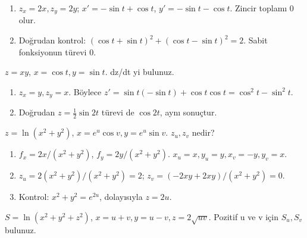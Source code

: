 \begin{tcolorbox}[title={Adım adım çözüm},colback=green!3!white,colframe=green]\begin{enumerate}
\item \(z_x=2x,z_y=2y\); \(x\prime=-\sin t+\cos t\), \(y\prime=-\sin t-\cos t\). Zincir toplamı 0 olur.
\item Doğrudan kontrol: \((\cos t+\sin t)^2+(\cos t-\sin t)^2=2\). Sabit fonksiyonun türevi 0.
\end{enumerate}\end{tcolorbox}
\begin{tcolorbox}[title={Örnek 6.2 | Çarpanlı fonksiyonda zincir kuralı},colframe=accent]\(z=xy\), \(x=\cos t,y=\sin t\). dz/dt yi bulunuz.
\par{}\end{tcolorbox}
\begin{tcolorbox}[title={Adım adım çözüm},colback=green!3!white,colframe=green]\begin{enumerate}
\item \(z_x=y,z_y=x\). Böylece \(z\prime=\sin t(-\sin t)+\cos t\cos t=\cos^2t-\sin^2t\).
\item Doğrudan \(z=\tfrac12\sin2t\) türevi de \(\cos2t\), aynı sonuçtur.
\end{enumerate}\end{tcolorbox}
\begin{tcolorbox}[title={Örnek 6.3 | Tahtadaki logaritma örneği},colframe=accent]\(z=\ln(x^2+y^2)\), \(x=e^u\cos v,y=e^u\sin v\). \(z_u,z_v\) nedir?
\par{}\end{tcolorbox}
\begin{tcolorbox}[title={Adım adım çözüm},colback=green!3!white,colframe=green]\begin{enumerate}
\item \(f_x=2x/(x^2+y^2)\), \(f_y=2y/(x^2+y^2)\). \(x_u=x,y_u=y,x_v=-y,y_v=x\).
\item \(z_u=2(x^2+y^2)/(x^2+y^2)=2\); \(z_v=(-2xy+2xy)/(x^2+y^2)=0\).
\item Kontrol: \(x^2+y^2=e^{2u}\), dolayısıyla \(z=2u\).
\end{enumerate}\end{tcolorbox}
\begin{tcolorbox}[title={Örnek 6.4 | Üç ara değişkenli ders örneği},colframe=accent]\(S=\ln(x^2+y^2+z^2)\), \(x=u+v,y=u-v,z=2\sqrt{uv}\). Pozitif u ve v için \(S_u,S_v\) bulunuz.
\par{}\end{tcolorbox}
